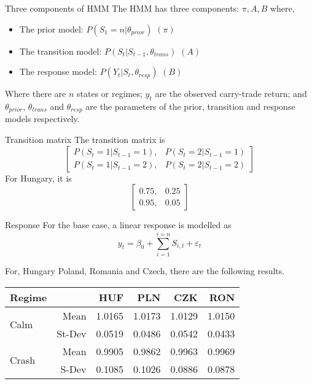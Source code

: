 \documentclass[14pt,xcolor=pdftex,dvipsnames,table, handout]{beamer}
\begin{document}
\begin{frame}{Three components of HMM}
The HMM has three components: $\pi, A, B$ where,
\begin{itemize}[<+-| alert@+>]
\item The prior model: $P(S_1 = n| \theta_{prior})$ $(\pi)$
\item The transition model: $P(S_t| S_{t-1}, \theta_{trans})$ $(A)$
\item The response model: $P(Y_t| S_t, \theta_{resp})$ $(B)$
\end{itemize}
\pause
Where there are $n$ states or regimes; $y_t$ are the observed carry-trade return; and $\theta_{prior}$, $\theta_{trans}$ and  $\theta_{resp}$ are the parameters of the prior, transition and response models respectively.
\end{frame}

\begin{frame}{Transition matrix}
The transition matrix is
\begin{equation*}
\begin{bmatrix}
P(S_t = 1|S_{t-1}=1),  & P(S_t = 2|S_{t-1}=1)\\
P(S_t = 1|S_{t-1}=2),  & P(S_t = 2|S_{t-1}=2)
\end{bmatrix}
\end{equation*}
For Hungary, it is 
\begin{equation*}
\begin{bmatrix}
0.75,  & 0.25\\
0.95,  & 0.05
\end{bmatrix}
\end{equation*}
\end{frame}

\begin{frame}{Response}
For the base case, a linear response is modelled as
\begin{equation*}
y_t = \beta_0 + \sum_{i=1}^{i=n}S_{i,t} + \varepsilon_t
\end{equation*}

For, Hungary Poland, Romania and Czech, there are the following results. 
\begin{center}
 \begin{tabular}{lrrrrr}
  \hline
 Regime& & HUF & PLN & CZK & RON \\ 
  \hline
   \multirow{2}{*}[5pt]{Calm}& Mean & 1.0165 & 1.0173 & 1.0129 & 1.0150 \\ 
&St-Dev& 0.0519 & 0.0486 & 0.0542 & 0.0433  \\ 
\hline
\multirow{2}{*}[5pt]{Crash}& Mean & 0.9905 & 0.9862 & 0.9963 & 0.9969  \\ 
 &S-Dev & 0.1085 & 0.1026 & 0.0886 & 0.0878 
\end{tabular}
\end{center}
\end{frame}
\end{document}
